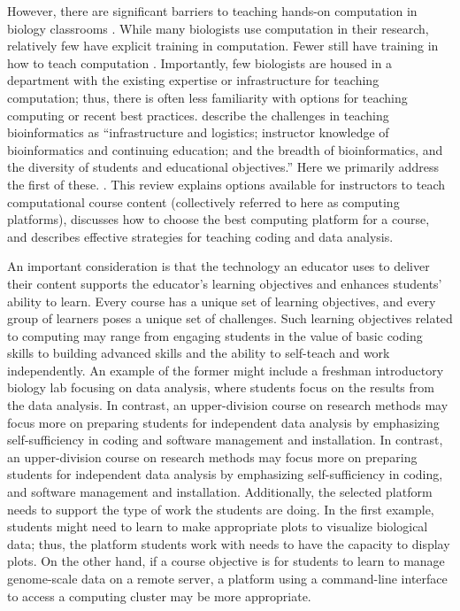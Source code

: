However, there are significant barriers to teaching hands-on computation in biology classrooms \citep{Williams17}.
While many biologists use computation in their research, relatively few have explicit training in computation. 
Fewer still have training in how to teach computation \citep{Williams17}.
Importantly, few biologists are housed in a department with the existing expertise or infrastructure for teaching computation;
thus, there is often less familiarity with options for teaching computing or recent best practices. 
\citet{Cummings10} describe the challenges in teaching bioinformatics as 
``infrastructure and logistics; instructor knowledge of bioinformatics and continuing education; and the breadth of bioinformatics, and the diversity of students and educational objectives.''
Here we primarily address the first of these. 
 \citep{Williams17}.
This review explains options available for instructors to teach computational course content
(collectively referred to here as computing platforms),
discusses how to choose the best computing platform for a course, 
and describes effective strategies for teaching coding and data analysis.


An important consideration is that the technology an educator uses to deliver their content supports the educator's learning objectives and enhances students' ability to learn. 
Every course has a unique set of learning objectives, and
every group of learners poses a unique set of challenges. 
Such learning objectives related to computing may range from engaging students in the value of basic coding skills to building advanced skills and the ability to self-teach and work independently.
An example of the former might include a freshman introductory biology lab focusing on data analysis, where students focus on the results from the data analysis. 
In contrast, an upper-division course on research methods may focus more on preparing students for independent data analysis by emphasizing self-sufficiency in coding and software management and installation.
In contrast, an upper-division course on research methods may focus more on preparing students for independent data analysis by emphasizing self-sufficiency in coding, and software management and installation.
Additionally, the selected platform needs to support the type of work the students are doing.
In the first example, students might need to learn to make appropriate plots to visualize biological data; thus, the platform students work with needs to have the capacity to display plots.
On the other hand, if a course objective is for students to learn to manage genome-scale data on a remote server, a platform using a command-line interface to access a computing cluster may be more appropriate.

